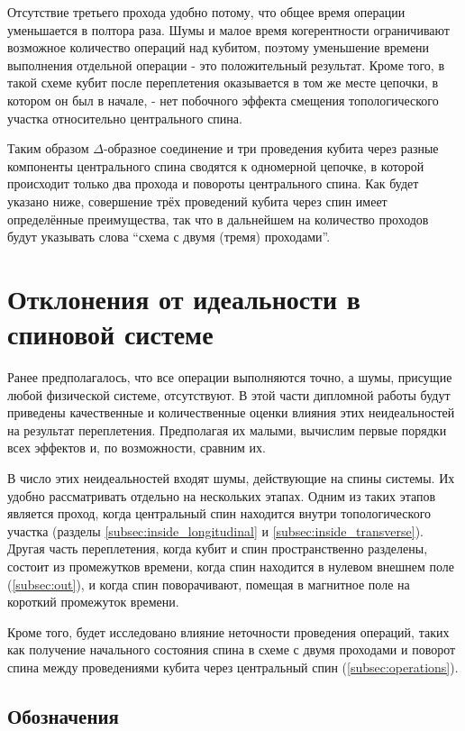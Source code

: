 \documentclass[a4paper,12pt]{article}
\theoremstyle{plain} %
\theoremstyle{definition} %
\theoremstyle{remark} %
\begin{document}
Отсутствие третьего прохода удобно потому, что общее время операции уменьшается в полтора раза. Шумы и малое время когерентности ограничивают возможное количество операций над кубитом, поэтому уменьшение времени выполнения отдельной операции - это положительный результат. Кроме того, в такой схеме кубит после переплетения оказывается в том же месте цепочки, в котором он был в начале, - нет побочного эффекта смещения топологического участка относительно центрального спина.

Таким образом $\Delta$-образное соединение и три проведения кубита через разные компоненты центрального спина сводятся к одномерной цепочке, в которой происходит только два прохода и повороты центрального спина. Как будет указано ниже, совершение трёх проведений кубита через спин имеет определённые преимущества, так что в дальнейшем на количество проходов будут указывать слова ``схема с двумя (тремя) проходами''.

\pagebreak

\section{Отклонения от идеальности в спиновой системе} \label{sec:results}

Ранее предполагалось, что все операции выполняются точно, а шумы, присущие любой физической системе, отсутствуют. В этой части дипломной работы будут приведены качественные и количественные оценки влияния этих неидеальностей на результат переплетения. Предполагая их малыми, вычислим первые порядки всех эффектов и, по возможности, сравним их.

В число этих неидеальностей входят шумы, действующие на спины системы. Их удобно рассматривать отдельно на нескольких этапах. Одним из таких этапов является проход, когда центральный спин находится внутри топологического участка (разделы \ref{subsec:inside_longitudinal} и \ref{subsec:inside_transverse}). Другая часть переплетения, когда кубит и спин пространственно разделены, состоит из промежутков времени, когда спин находится в нулевом внешнем поле (\ref{subsec:out}), и когда спин поворачивают, помещая в магнитное поле на короткий промежуток времени.

Кроме того, будет исследовано влияние неточности проведения операций, таких как получение начального состояния спина в схеме с двумя проходами и поворот спина между проведениями кубита через центральный спин (\ref{subsec:operations}).

\subsection{Обозначения}
\end{document}
